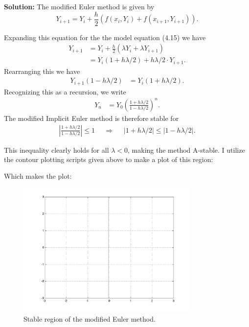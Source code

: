 \documentclass[11pt]{article}
\def\f{\frac }
\begin{document}
\begin{enumerate}
\textbf{Solution:} The modified Euler method is given by
\begin{equation} Y_{i+1} = Y_i + \f{h}{2} \left ( f(x_i,Y_i) + f(x_{i+1},Y_{i+1})\right ) . \end{equation}

Expanding this equation for the the model equation (4.15) we have
\begin{align} Y_{i+1} &= Y_i + \f{h}{2} \left ( \lambda Y_i + \lambda Y_{i+1}\right ) \\
&= Y_i (1+h\lambda /2) + h \lambda /2 \cdot Y_{i+1}. \end{align}
Rearranging this we have
\begin{align} Y_{i+1}(1-h\lambda /2) &= Y_i (1+h\lambda /2) . \end{align}
Recognizing this as a recursion, we write
\begin{align} Y_{n} &= Y_0 \left ( \frac{1+h\lambda /2 }{1-h\lambda /2} \right )^n . \end{align}
The modified Implicit Euler method is therefore stable for 
\begin{align} \left | \frac{1+h\lambda /2}{1-h\lambda /2} \right | \leq 1 ~~~~~~\Rightarrow ~~~~~~ \left | 1+h\lambda /2 \right |  \leq  \left | 1-h\lambda /2 \right |. \end{align}

This inequality clearly holds for all $\lambda < 0$, making the method A-stable.
I utilize the contour plotting scripts given above to make a plot of this region:


Which makes the plot:
\begin{figure}[h!]
  \centering
    \includegraphics[width=0.8\textwidth]{andy_hw04_prb06_01.png}
  \caption{Stable region of the modified Euler method.}
\end{figure}


\end{enumerate}
\end{document}
